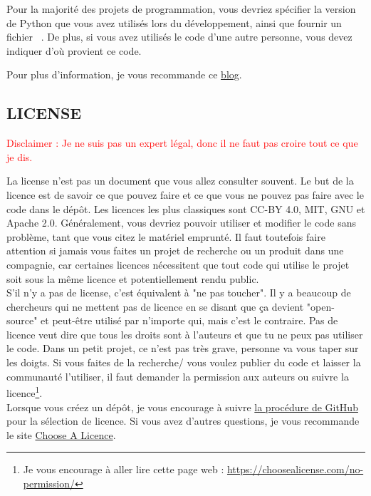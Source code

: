 \documentclass{book}
\newcommand{\code}[1]{\mbox{%
    \ttfamily
    \tcbox[
        on line,
        boxsep=0pt, left=4pt, right=4pt, top=2pt, bottom=1.5pt,
        toprule=0pt, rightrule=0pt, bottomrule=0pt, leftrule=0pt,
        oversize=0pt, enlarge left by=0pt, enlarge right by=0pt,
        colframe=white, colback=black!12,
        height=.8\baselineskip %
    ]{#1}%
}}
\begin{document}
Pour la majorité des projets de programmation, vous devriez spécifier la version de Python que vous avez utilisés lors du développement, ainsi que fournir un fichier \code{requirements.txt}. De plus, si vous avez utilisés le code d'une autre personne, vous devez indiquer d'où provient ce code.

Pour plus d'information, je vous recommande ce \href{https://www.freecodecamp.org/news/how-to-write-a-good-readme-file/}{blog}.
\subsection{LICENSE}

\textcolor{red}{Disclaimer : Je ne suis pas un expert légal, donc il ne faut pas croire tout ce que je dis.\\}

La license n'est pas un document que vous allez consulter souvent. Le but de la licence est de savoir ce que pouvez faire et ce que vous ne pouvez pas faire avec le code dans le dépôt. Les licences les plus classiques sont CC-BY 4.0, MIT, GNU et Apache 2.0. Généralement, vous devriez pouvoir utiliser et modifier le code sans problème, tant que vous citez le matériel emprunté. Il faut toutefois faire attention si jamais vous faites un projet de recherche ou un produit dans une compagnie, car certaines licences nécessitent que tout code qui utilise le projet soit sous la même licence et potentiellement rendu public. \\

S'il n'y a pas de license, c'est équivalent à "ne pas toucher". Il y a beaucoup de chercheurs qui ne mettent pas de licence en se disant que ça devient "open-source" et peut-être utilisé par n'importe qui, mais c'est le contraire. Pas de licence veut dire que tous les droits sont à l'auteurs et que tu ne peux pas utiliser le code. Dans un petit projet, ce n'est pas très grave, personne va vous taper sur les doigts. Si vous faites de la recherche/ vous voulez publier du code et laisser la communauté l'utiliser, il faut demander la permission aux auteurs ou suivre la licence\footnote{Je vous encourage à aller lire cette page web : \url{https://choosealicense.com/no-permission/}}. \\

Lorsque vous créez un dépôt, je vous encourage à suivre \href{https://docs.github.com/fr/repositories/managing-your-repositorys-settings-and-features/customizing-your-repository/licensing-a-repository}{la procédure de GitHub} pour la sélection de licence. Si vous avez d'autres questions, je vous recommande le site \href{https://choosealicense.com/}{Choose A Licence}.
\end{document}
